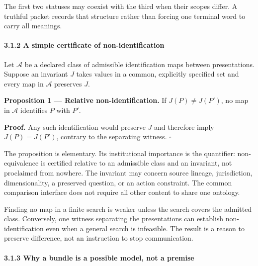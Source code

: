 \documentclass[
  10pt,
]{article}
\begin{document}
The first two statuses may coexist with the third when their scopes differ. A truthful packet records that structure rather than forcing one terminal word to carry all meanings.

\paragraph{3.1.2 A simple certificate of non-identification}\label{a-simple-certificate-of-non-identification}

Let \protect\hypertarget{math-E0013-0013}{}{\(\mathcal A\)} be a declared class of admissible identification maps between presentations. Suppose an invariant \protect\hypertarget{math-E0014-0014}{}{\(J\)} takes values in a common, explicitly specified set and every map in \protect\hypertarget{math-E0013-0015}{}{\(\mathcal A\)} preserves \protect\hypertarget{math-E0014-0016}{}{\(J\)}.

\textbf{Proposition 1 --- Relative non-identification.} If \protect\hypertarget{math-E0015-0017}{}{\(J(P)\ne J(P')\)}, no map in \protect\hypertarget{math-E0013-0018}{}{\(\mathcal A\)} identifies \protect\hypertarget{math-E0016-0019}{}{\(P\)} with \protect\hypertarget{math-E0017-0020}{}{\(P'\)}.

\textbf{Proof.} Any such identification would preserve \protect\hypertarget{math-E0014-0021}{}{\(J\)} and therefore imply \protect\hypertarget{math-E0018-0022}{}{\(J(P)=J(P')\)}, contrary to the separating witness. \protect\hypertarget{math-E0019-0023}{}{\(\square\)}

The proposition is elementary. Its institutional importance is the quantifier: non-equivalence is certified relative to an admissible class and an invariant, not proclaimed from nowhere. The invariant may concern source lineage, jurisdiction, dimensionality, a preserved question, or an action constraint. The common comparison interface does not require all other content to share one ontology.

Finding no map in a finite search is weaker unless the search covers the admitted class. Conversely, one witness separating the presentations can establish non-identification even when a general search is infeasible. The result is a reason to preserve difference, not an instruction to stop communication.

\paragraph{3.1.3 Why a bundle is a possible model, not a premise}\label{why-a-bundle-is-a-possible-model-not-a-premise}
\end{document}
